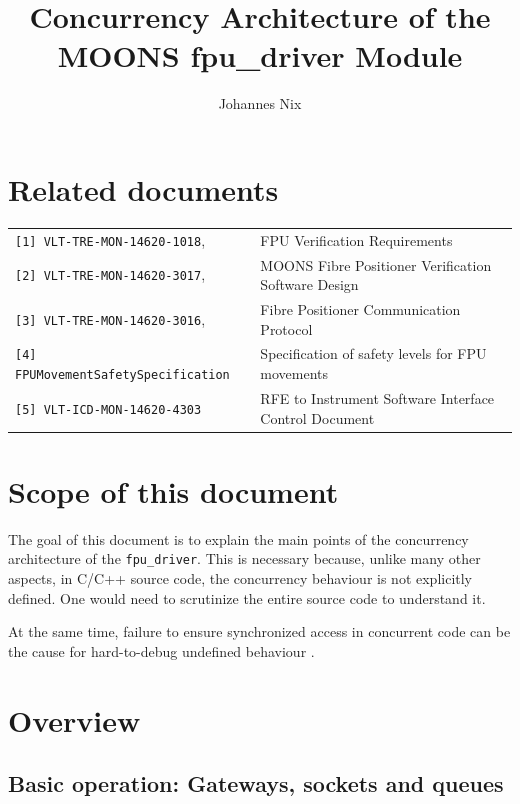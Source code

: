 \documentclass[fontsize=12,a4paper]{scrartcl}
\begin{document}
\title{Concurrency Architecture of the MOONS fpu\_driver Module}


\author{Johannes Nix}

\maketitle

\tableofcontents

\section{Related documents}

\begin{tabular}{|ll|}
  \hline
\verb+[1] VLT-TRE-MON-14620-1018+, &  FPU Verification Requirements \\
\verb+[2] VLT-TRE-MON-14620-3017+, & MOONS Fibre Positioner Verification Software Design \\
\verb+[3] VLT-TRE-MON-14620-3016+, & Fibre Positioner Communication Protocol\\
\verb+[4] FPUMovementSafetySpecification+ & Specification of safety levels for FPU movements\\
\verb+[5] VLT-ICD-MON-14620-4303+ & RFE to Instrument Software Interface Control Document \\
\hline
\end{tabular}


\section{Scope of this document}

The goal of this document is to explain the main points of the
concurrency architecture of the \texttt{fpu\_driver}.  This is
necessary because, unlike many other aspects, in C/C++ source code,
the concurrency behaviour is not explicitly defined.  One would need
to scrutinize the entire source code to understand it.

At the same time, failure to ensure synchronized access
in concurrent code can be the cause for hard-to-debug
undefined behaviour \cite{Regehr:AGtUBPt3}\cite{MeyersAlexandrescu:2004:DCL}.

\section{Overview}

\subsection{Basic operation: Gateways, sockets and queues}
\end{document}
